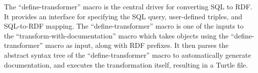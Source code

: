 The ``define-transformer'' macro is the central driver for converting SQL to RDF.  It provides an interface for specifying the SQL query, user-defined triples, and SQL-to-RDF mapping. The ``define-transformer'' macro is one of the inputs to the ``transform-with-documentation'' macro which takes objects using the ``define-transformer'' macro as input, along with RDF prefixes. It then parses the abstract syntax tree of the ``define-transformer'' macro to automatically generate documentation, and executes the transformation itself, resulting in a Turtle file.

